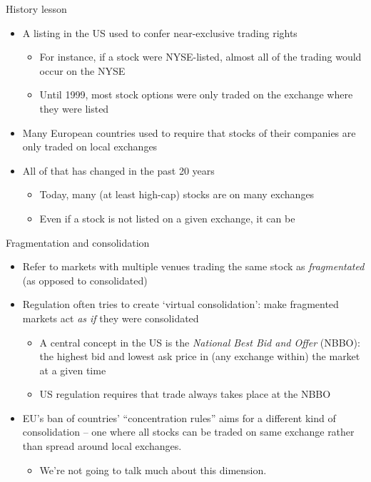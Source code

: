 \documentclass[english,10pt
,aspectratio=169
]{beamer}
\begin{document}
\begin{frame}{History lesson}
	\begin{itemize}
		\item A listing in the US used to confer near-exclusive trading rights
		\begin{itemize}
			\item For instance, if a stock were NYSE-listed, almost all of the trading would occur on the NYSE
			\item Until 1999, most stock options were only traded on the exchange where they were listed
		\end{itemize}
		\item Many European countries used to require that stocks of their companies are only traded on local exchanges
		\item All of that has changed in the past 20 years
		\begin{itemize}
			\item Today, many (at least high-cap) stocks are  on many exchanges
			\item Even if a stock is not listed on a given exchange, it can be 
		\end{itemize}
	\end{itemize}
\end{frame}


\begin{frame}{Fragmentation and consolidation}
	\begin{itemize}
		\item Refer to markets with multiple venues trading the same stock as \textit{fragmentated} (as opposed to consolidated)
		\item Regulation often tries to create `virtual consolidation': make fragmented markets act \textit{as if} they were consolidated
		\begin{itemize}
			\item A central concept in the US is the \textit{National Best Bid and Offer} (NBBO): the highest bid and lowest ask price in (any exchange within) the market at a given time
			\item US regulation requires that trade always takes place at the NBBO
		\end{itemize}
		\item EU's ban of countries' ``concentration rules'' aims for a different kind of consolidation -- one where all stocks can be traded on same exchange rather than spread around local exchanges.
		\begin{itemize}
			\item We're not going to talk much about this dimension.
		\end{itemize}
	\end{itemize}
\end{frame}
\end{document}
